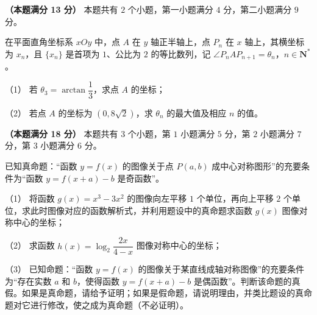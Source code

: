 \begin{question}
\textbf{（本题满分 13 分）} 本题共有 $2$ 个小题，第一小题满分 $4$ 分，第二小题满分 $9$ 分。

在平面直角坐标系 $xOy$ 中，点 $A$ 在 $y$ 轴正半轴上，点 $P_n$ 在 $x$ 轴上，其横坐标为 $x_n$，且 $\{x_n\}$ 是首项为 $1$、公比为 $2$ 的等比数列，记 $\angle P_nAP_{n+1}=\theta_n$，$n\in\mathbf N^*$。
\nopagebreak[4]
\begin{center}\end{center}
\nopagebreak[4]
（1） 若 $\theta_3=\arctan\dfrac13$，求点 $A$ 的坐标；

（2） 若点 $A$ 的坐标为 $(0,8\sqrt2)$，求 $\theta_n$ 的最大值及相应 $n$ 的值。

\end{question}
\begin{question}
\textbf{（本题满分 18 分）} 本题共有 $3$ 个小题，第 $1$ 小题满分 $5$ 分，第 $2$ 小题满分 $7$ 分，第 $3$ 小题满分 $6$ 分。

已知真命题：“函数 $y=f(x)$ 的图像关于点 $P(a,b)$ 成中心对称图形”的充要条件为“函数 $y=f(x+a)-b$ 是奇函数”。

（1） 将函数 $g(x)=x^3-3x^2$ 的图像向左平移 $1$ 个单位，再向上平移 $2$ 个单位，求此时图像对应的函数解析式，并利用题设中的真命题求函数 $g(x)$ 图像对称中心的坐标；

（2） 求函数 $h(x)=\log_2\dfrac{2x}{4-x}$ 图像对称中心的坐标；

（3） 已知命题：“函数 $y=f(x)$ 的图像关于某直线成轴对称图像”的充要条件为“存在实数 $a$ 和 $b$，使得函数 $y=f(x+a)-b$ 是偶函数”。判断该命题的真假。如果是真命题，请给予证明；如果是假命题，请说明理由，并类比题设的真命题对它进行修改，使之成为真命题（不必证明）。

\end{question}